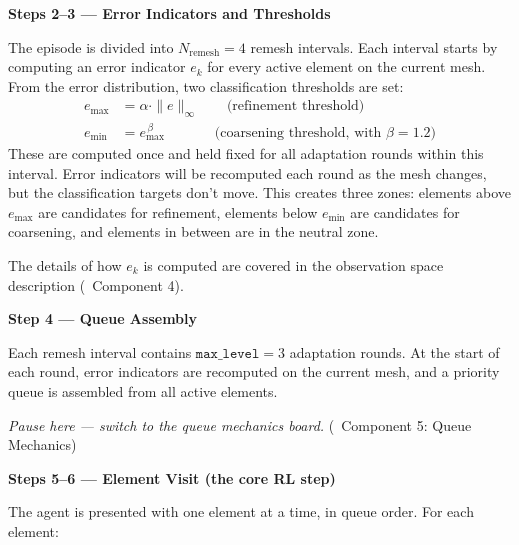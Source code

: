 \documentclass[11pt]{article}
\begin{document}
\vspace{0.3cm}

\noindent\textbf{\textcolor{intervalcolor}{Steps 2--3 --- Error Indicators and Thresholds}}

The episode is divided into $N_{\text{remesh}} = 4$ remesh intervals. Each interval starts by computing an error indicator $e_k$ for every active element on the current mesh. From the error distribution, two classification thresholds are set:
%
\begin{align*}
e_{\max} &= \alpha \cdot \|e\|_\infty \qquad \text{(refinement threshold)} \\
e_{\min} &= e_{\max}^{\,\beta} \qquad\quad\;\; \text{(coarsening threshold, with } \beta = 1.2 \text{)}
\end{align*}
%
These are computed once and held fixed for all adaptation rounds within this interval. Error indicators will be recomputed each round as the mesh changes, but the classification targets don't move. This creates three zones: elements above $e_{\max}$ are candidates for refinement, elements below $e_{\min}$ are candidates for coarsening, and elements in between are in the neutral zone.

The details of how $e_k$ is computed are covered in the observation space description (\textrightarrow~Component 4).

\vspace{0.3cm}

\noindent\textbf{\textcolor{roundcolor}{Step 4 --- Queue Assembly}}

Each remesh interval contains $\texttt{max\_level} = 3$ adaptation rounds. At the start of each round, error indicators are recomputed on the current mesh, and a priority queue is assembled from all active elements.

\textit{Pause here --- switch to the queue mechanics board.} (\textrightarrow~Component 5: Queue Mechanics)

\vspace{0.3cm}

\noindent\textbf{\textcolor{elementcolor}{Steps 5--6 --- Element Visit (the core RL step)}}

The agent is presented with one element at a time, in queue order. For each element:
\end{document}
